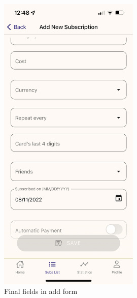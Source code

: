 \documentclass[12pt]{article}
\begin{document}
\begin{figure}[h!]
    \centering
    \begin{minipage}[c]{0.45\textwidth}
        \centering
        \includegraphics[width=0.6\textwidth, clip]{../../assets/smartphone/add2.PNG}
        \caption{Final fields in add form}
        \label{fig:add2}
    \end{minipage}\hspace{1cm}%
    \begin{minipage}[c]{0.45\textwidth}
        \centering

\end{minipage}
\end{figure}
\end{document}

